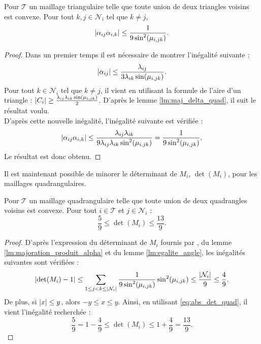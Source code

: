 \documentclass[12pt,a4paper]{article}
\begin{document}
	
	\begin{lm}\label{lm:majoration_produit_alpha_quad}
		Pour $\mathcal T$ un maillage triangulaire telle que toute union de deux triangles voisins est convexe. Pour tout $k,j \in \mathcal N_i$ tel que $k \not = j$,
		\begin{equation}
			\left\lvert \alpha_{ij}\alpha_{i,k} \right\rvert \leq \dfrac{1}{9\sin^2(\mu_{i,jk})}.
		\end{equation}
	\end{lm}
	\begin{proof}
		Dans un premier temps il est nécessaire de montrer l'inégalité suivante :
		\begin{equation}
			\left\lvert \alpha_{ij} \right\rvert \leq \dfrac{\lambda_{ij}}{3\lambda_{ik}\sin(\mu_{i,jk})}.
		\end{equation}
		Pour tout $k \in \mathcal N_i$ tel que $k \not = j$, il vient en utilisant la formule de l'aire d'un triangle : $\left\lvert C_i \right\rvert \geq \frac{\lambda_{ij}\lambda_{ik}\sin(\mu_{i,jk})}2$. D'après le lemme \ref{lm:maj_delta_quad}, il suit le résultat voulu.\\
		D'après cette nouvelle inégalité, l'inégalité suivante est vérifiée : \[\left\lvert \alpha_{ij}\alpha_{i,k} \right\rvert \leq \dfrac{\lambda_{ij}\lambda_{ik}}{9\lambda_{ij}\lambda_{ik}\sin^2(\mu_{i,jk})} = \dfrac1{9\sin^2(\mu_{i,jk})}.\]
		Le résultat est donc obtenu.
	\end{proof}
	
	
	
	Il est maintenant possible de minorer le déterminant de $M_i$, $\det(M_i)$, pour les maillages quadrangulaires.
	
	\begin{lm}\label{lm:maj_det_quad}
		Pour $\mathcal T$ un maillage quadrangulaire telle que toute union de deux quadrangles voisins est convexe. Pour tout $i \in\mathcal{T}$ et $j \in \mathcal N_i$ :
		\begin{equation}
			\frac59 \leq \det(M_i) \leq \dfrac{13}9.
		\end{equation}
	\end{lm}
	\begin{proof}
		D'après l'expression du déterminant de $M_i$ fournis par \cite{florent}, du lemme \ref{lm:majoration_produit_alpha} et du lemme \ref{lm:egalite_angle}, les inégalités suivantes sont vérifiées :
		\begin{equation}\label{eq:abs_det_quad}
			\left\lvert \det(M_i)-1 \right\rvert \leq \sum_{1\leq j < k \leq  \left\lvert \mathcal N_i \right\rvert} \dfrac1{9\sin^2(\mu_{i,jk})}\sin^2(\mu_{i,jk}) \leq  \frac{\left\lvert \mathcal N_i \right\rvert}9 \leq \frac49.
		\end{equation}
		De plus, si $\left\lvert x \right\rvert \leq y$, alors $-y\leq x \leq y$. Ainsi, en utilisant \eqref{eq:abs_det_quad}, il vient l'inégalité recherchée :
		\begin{equation}
			\frac59 = 1-\frac49 \leq \det(M_i) \leq 1+\frac49 = \frac{13}9.
		\end{equation}
	\end{proof}
	
\end{document}

